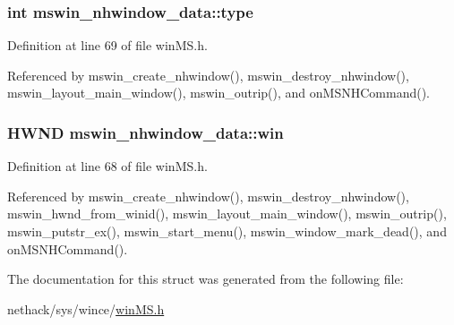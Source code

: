 \hypertarget{structmswin__nhwindow__data_aacbfb89655cec852a2e1d64e626392ec}{
\subsubsection[{type}]{\setlength{\rightskip}{0pt plus 5cm}int mswin\+\_\+nhwindow\+\_\+data\+::type}}\label{structmswin__nhwindow__data_aacbfb89655cec852a2e1d64e626392ec}


Definition at line 69 of file win\+M\+S.\+h.



Referenced by mswin\+\_\+create\+\_\+nhwindow(), mswin\+\_\+destroy\+\_\+nhwindow(), mswin\+\_\+layout\+\_\+main\+\_\+window(), mswin\+\_\+outrip(), and on\+M\+S\+N\+H\+Command().

\hypertarget{structmswin__nhwindow__data_ae10a423b314e3c84ef33e6c57f7447d4}{
\subsubsection[{win}]{\setlength{\rightskip}{0pt plus 5cm}H\+W\+N\+D mswin\+\_\+nhwindow\+\_\+data\+::win}}\label{structmswin__nhwindow__data_ae10a423b314e3c84ef33e6c57f7447d4}


Definition at line 68 of file win\+M\+S.\+h.



Referenced by mswin\+\_\+create\+\_\+nhwindow(), mswin\+\_\+destroy\+\_\+nhwindow(), mswin\+\_\+hwnd\+\_\+from\+\_\+winid(), mswin\+\_\+layout\+\_\+main\+\_\+window(), mswin\+\_\+outrip(), mswin\+\_\+putstr\+\_\+ex(), mswin\+\_\+start\+\_\+menu(), mswin\+\_\+window\+\_\+mark\+\_\+dead(), and on\+M\+S\+N\+H\+Command().



The documentation for this struct was generated from the following file\+:\begin{DoxyCompactItemize}
\item 
nethack/sys/wince/\hyperlink{sys_2wince_2winMS_8h}{win\+M\+S.\+h}\end{DoxyCompactItemize}
